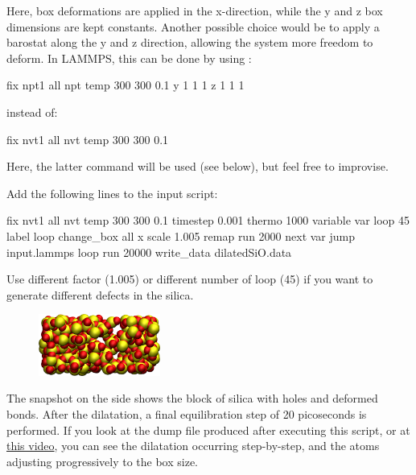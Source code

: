 \begin{tcolorbox}[colback=mylightblue!5!white,colframe=mylightblue!75!black,title=NVT vs 2D barostat]
Here, box deformations are applied in the x-direction, while the 
y and z box dimensions are kept constants. 
Another possible choice would be to apply a barostat along the y and z 
direction, allowing the system more freedom to deform. In LAMMPS, this 
can be done by using :
\begin{lcverbatim}
fix npt1 all npt temp 300 300 0.1 y 1 1 1 z 1 1 1
\end{lcverbatim}

\noindent instead of:

\begin{lcverbatim}
fix nvt1 all nvt temp 300 300 0.1
\end{lcverbatim}

\noindent Here, the latter command will be used (see below), but feel free to improvise.
\end{tcolorbox}

\noindent Add the following lines to the input script:

\begin{lcverbatim}
fix nvt1 all nvt temp 300 300 0.1
timestep 0.001
thermo 1000
variable var loop 45
label loop
change_box all x scale 1.005 remap
run 2000
next var
jump input.lammps loop
run 20000
write_data dilatedSiO.data
\end{lcverbatim}

\noindent Use different factor (1.005) or different number of 
loop (45) if you want to generate different defects in the silica.

\hspace{-0.45cm}\begin{figure}
\includegraphics[width=4cm]{tutorials/level3/water-adsorption-in-silica/cracked-light.png}
\end{figure}

\noindent The snapshot on the side shows the block of silica with holes and deformed bonds.
After the dilatation, a final equilibration step of 20
picoseconds is performed. If you look at the dump file
produced after executing this script, or at \href{https://www.youtube.com/watch?v=8rBqYIcTgno&ab_channel=SimonGravelle}{this video},
you can see the dilatation occurring step-by-step, and the
atoms adjusting progressively to the box size. 


